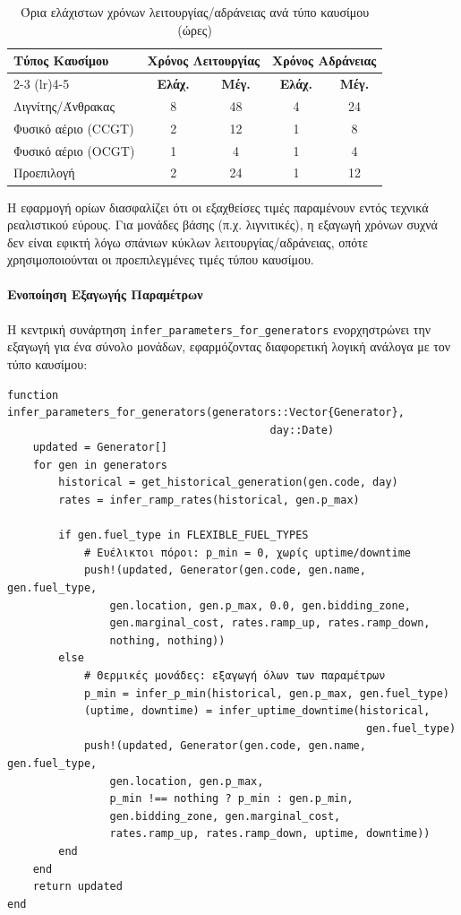 \begin{table}[htbp]
\centering
\caption{Όρια ελάχιστων χρόνων λειτουργίας/αδράνειας ανά τύπο καυσίμου (ώρες)}
\label{tab:uptime-downtime-bounds}
\begin{tabular}{@{}lcccc@{}}
\toprule
\textbf{Τύπος Καυσίμου} & \multicolumn{2}{c}{\textbf{Χρόνος Λειτουργίας}} & \multicolumn{2}{c}{\textbf{Χρόνος Αδράνειας}} \\
\cmidrule(lr){2-3} \cmidrule(lr){4-5}
& \textbf{Ελάχ.} & \textbf{Μέγ.} & \textbf{Ελάχ.} & \textbf{Μέγ.} \\
\midrule
Λιγνίτης/Άνθρακας & 8 & 48 & 4 & 24 \\
Φυσικό αέριο (CCGT) & 2 & 12 & 1 & 8 \\
Φυσικό αέριο (OCGT) & 1 & 4 & 1 & 4 \\
Προεπιλογή & 2 & 24 & 1 & 12 \\
\bottomrule
\end{tabular}
\end{table}

Η εφαρμογή ορίων διασφαλίζει ότι οι εξαχθείσες τιμές παραμένουν εντός τεχνικά ρεαλιστικού εύρους. Για μονάδες βάσης (π.χ. λιγνιτικές), η εξαγωγή χρόνων συχνά δεν είναι εφικτή λόγω σπάνιων κύκλων λειτουργίας/αδράνειας, οπότε χρησιμοποιούνται οι προεπιλεγμένες τιμές τύπου καυσίμου.

\paragraph{Ενοποίηση Εξαγωγής Παραμέτρων}
Η κεντρική συνάρτηση \texttt{infer\_parameters\_for\_generators} ενορχηστρώνει την εξαγωγή για ένα σύνολο μονάδων, εφαρμόζοντας διαφορετική λογική ανάλογα με τον τύπο καυσίμου:

\begin{samepage}
\begin{verbatim}
function infer_parameters_for_generators(generators::Vector{Generator},
                                         day::Date)
    updated = Generator[]
    for gen in generators
        historical = get_historical_generation(gen.code, day)
        rates = infer_ramp_rates(historical, gen.p_max)

        if gen.fuel_type in FLEXIBLE_FUEL_TYPES
            # Ευέλικτοι πόροι: p_min = 0, χωρίς uptime/downtime
            push!(updated, Generator(gen.code, gen.name, gen.fuel_type,
                gen.location, gen.p_max, 0.0, gen.bidding_zone,
                gen.marginal_cost, rates.ramp_up, rates.ramp_down,
                nothing, nothing))
        else
            # Θερμικές μονάδες: εξαγωγή όλων των παραμέτρων
            p_min = infer_p_min(historical, gen.p_max, gen.fuel_type)
            (uptime, downtime) = infer_uptime_downtime(historical,
                                                        gen.fuel_type)
            push!(updated, Generator(gen.code, gen.name, gen.fuel_type,
                gen.location, gen.p_max,
                p_min !== nothing ? p_min : gen.p_min,
                gen.bidding_zone, gen.marginal_cost,
                rates.ramp_up, rates.ramp_down, uptime, downtime))
        end
    end
    return updated
end
\end{verbatim}
\end{samepage}

